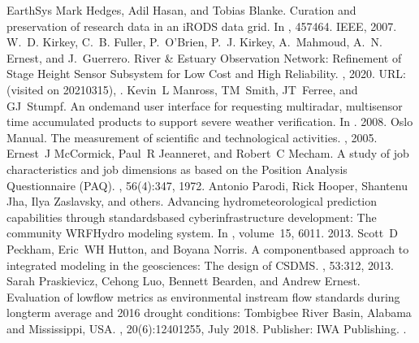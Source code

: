 \documentclass[letterpaper,12pt,english,openany,oneside]{sphinxmanual}
\begin{document}
\begin{sphinxthebibliography}{EarthSys}
\sphinxAtStartPar
Mark Hedges, Adil Hasan, and Tobias Blanke. Curation and preservation of research data in an iRODS data grid. In , 457\textendash{}464. IEEE, 2007.
\sphinxAtStartPar
W. D. Kirkey, C. B. Fuller, P. O’Brien, P. J. Kirkey, A. Mahmoud, A. N. Ernest, and J. Guerrero. River \& Estuary Observation Network: Refinement of Stage Height Sensor Subsystem for Low Cost and High Reliability. , 2020. URL:  (visited on 2021\sphinxhyphen{}03\sphinxhyphen{}15), .
\sphinxAtStartPar
Kevin L Manross, TM Smith, JT Ferree, and GJ Stumpf. An on\sphinxhyphen{}demand user interface for requesting multi\sphinxhyphen{}radar, multi\sphinxhyphen{}sensor time accumulated products to support severe weather verification. In . 2008.
\sphinxAtStartPar
Oslo Manual. The measurement of scientific and technological activities. , 2005.
\sphinxAtStartPar
Ernest J McCormick, Paul R Jeanneret, and Robert C Mecham. A study of job characteristics and job dimensions as based on the Position Analysis Questionnaire (PAQ). , 56(4):347, 1972.
\sphinxAtStartPar
Antonio Parodi, Rick Hooper, Shantenu Jha, Ilya Zaslavsky, and others. Advancing hydrometeorological prediction capabilities through standards\sphinxhyphen{}based cyberinfrastructure development: The community WRF\sphinxhyphen{}Hydro modeling system. In , volume 15, 6011. 2013.
\sphinxAtStartPar
Scott D Peckham, Eric WH Hutton, and Boyana Norris. A component\sphinxhyphen{}based approach to integrated modeling in the geosciences: The design of CSDMS. , 53:3\textendash{}12, 2013.
\sphinxAtStartPar
Sarah Praskievicz, Cehong Luo, Bennett Bearden, and Andrew Ernest. Evaluation of low\sphinxhyphen{}flow metrics as environmental instream flow standards during long\sphinxhyphen{}term average and 2016 drought conditions: Tombigbee River Basin, Alabama and Mississippi, USA. , 20(6):1240\textendash{}1255, July 2018. Publisher: IWA Publishing. .

\end{sphinxthebibliography}
\end{document}
